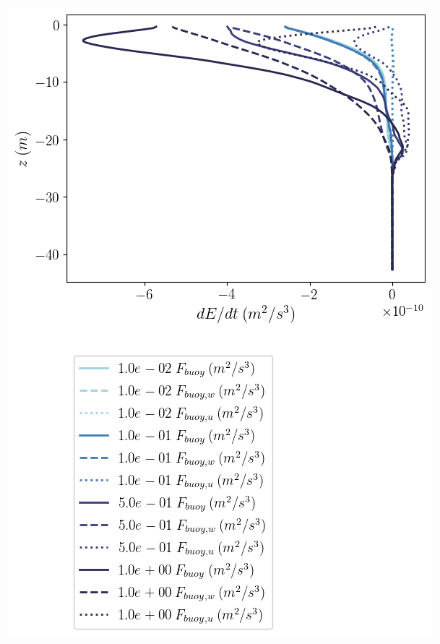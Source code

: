 \documentclass[draft]{agujournal2019}
\begin{document}
\begin{figure}
\begin{minipage}{0.5\textwidth}
    \end{minipage}
    \newline
    \begin{minipage}{0.5\textwidth}
        \includegraphics[trim={0 11cm 0 0},clip,width=\textwidth]{Figures/Fbuoy_cmp_dslope_46h_tav13_z_profile.png}
    \end{minipage}%
    \begin{minipage}{0.5\textwidth}

\end{minipage}
\end{figure}
\end{document}
